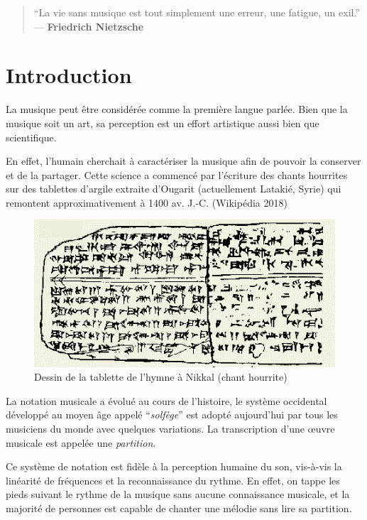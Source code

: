 \documentclass[]{article}
\begin{document}
{
\setcounter{tocdepth}{2}
\tableofcontents
}
\pagebreak

\begin{quote}
``La vie sans musique est tout simplement une erreur, une fatigue, un
exil.'' --- \textbf{Friedrich Nietzsche}
\end{quote}

\hypertarget{introduction}{%
\section{Introduction}\label{introduction}}

La musique peut être considérée comme la première langue parlée. Bien
que la musique soit un art, sa perception est un effort artistique aussi
bien que scientifique.

En effet, l'humain cherchait à caractériser la musique afin de pouvoir
la conserver et de la partager. Cette science a commencé par l'écriture
des chants hourrites sur des tablettes d'argile extraite d'Ougarit
(actuellement Latakié, Syrie) qui remontent approximativement à 1400 av.
J.-C. (Wikipédia 2018)

\begin{figure}
\centering
\includegraphics{img/Hurritische_hymne.png}
\caption{Dessin de la tablette de l'hymne à Nikkal (chant hourrite)}
\end{figure}

La notation musicale a évolué au cours de l'histoire, le système
occidental développé au moyen âge appelé ``\emph{solfège}'' est adopté
aujourd'hui par tous les musiciens du monde avec quelques variations. La
transcription d'une œuvre musicale est appelée une \emph{partition}.

Ce système de notation est fidèle à la perception humaine du son,
vis-à-vis la linéarité de fréquences et la reconnaissance du rythme. En
effet, on tappe les pieds suivant le rythme de la musique sans aucune
connaissance musicale, et la majorité de personnes est capable de
chanter une mélodie sans lire sa partition.
\end{document}
